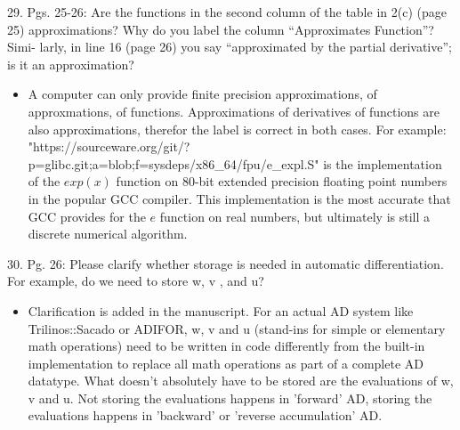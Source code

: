 \documentclass{article}
\begin{document}
\begin{enumerate}
29. Pgs. 25-26: Are the functions in the second column of the table in 2(c) (page 25)
approximations? Why do you label the column “Approximates Function”? Simi-
larly, in line 16 (page 26) you say “approximated by the partial derivative”; is it an
approximation?
{\color{red}  
\begin{itemize}
     \item
      A computer can only provide finite precision approximations, of approxmations, of functions. Approximations of derivatives of functions are also approximations, therefor the label is correct in both cases. For example: "https://sourceware.org/git/?p=glibc.git;a=blob;f=sysdeps/x86_64/fpu/e_expl.S" is the implementation of the $exp(x)$ function on 80-bit extended precision floating point numbers in the popular GCC compiler. This implementation is the most accurate that GCC provides for the $e$ function on real numbers, but ultimately is still a discrete numerical algorithm.
  \end{itemize}}

30. Pg. 26: Please clarify whether storage is needed in automatic differentiation. For
example, do we need to store w, v , and u?

{\color{red}  
\begin{itemize}
     \item
      Clarification is added in the manuscript. For an actual AD system like Trilinos::Sacado or ADIFOR, w, v and u (stand-ins for simple or elementary math operations) need to be written in code differently from the built-in implementation to replace all math operations as part of a complete AD datatype. What doesn't absolutely have to be stored are the evaluations of w, v and u. Not storing the evaluations happens in 'forward' AD, storing the evaluations happens in 'backward' or 'reverse accumulation' AD.  
  \end{itemize}}


  \end{enumerate}
\end{document}
